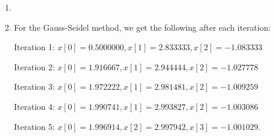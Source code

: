 \documentclass[12pt]{article}
\begin{document}
\begin{enumerate}[leftmargin=0em]
\begin{enumerate}[leftmargin=!]
        \item

        \begin{proof}
            Note that by part $(a)$, we have that for any vector $x\neq 0$,
            \[||A|| = \max_{y\neq 0}\frac{||Ay||}{||y||} \geq \frac{||Ax||}{||x||}.\]
            Multiplying by $||x||$ gives that $||Ax||\leq ||A||||x||$ for all $x\neq 0$. Furthermore, note that the inequality also holds when $x=0$, since $Ax=0$. Therefore,
            \[||Ax||\leq ||A||||x||\]
            for all $x$. We then have that
            \[||AB|| = \max_{||x||=1||}||ABx||  \leq \max_{||x||=1}||A||||Bx||=||A||\max_{||x||=1}||Bx||= ||A||||B||\]
            which is the desired result.
        \end{proof}
        
        \item 
        \begin{proof}
            By repetedly applying part $(b)$, we have that for all $k\in \NN$ 
            \[||A^k||= ||A\cdot A^{k-1}||\leq ||A||||A^{k-1}|| =||A||||A\cdot A^{k-2}|| \leq {||A||}^2||A^{k-2}|| \leq \ldots ||A||^{k}.\]
        \end{proof}
        
        \item 
        \begin{proof}
            Note that by part $(b)$, we have
            \[||A||||A^{-1}|| \geq ||AA^{-1}|| = ||I|| = \max_{||x||=1}||Ix|| = \max_{||x||=1}||x|| = 1\]
            which is the desired result.
        \end{proof}
    \end{enumerate}

    \item 

    \item 
    For the Gauss-Seidel method, we get the following after each iteration:

    Iteration 1: $x[0] = 0.5000000, x[1] = 2.833333, x[2] = -1.083333$

    Iteration 2: $x[0] = 1.916667, x[1] = 2.944444, x[2] = -1.027778$

    Iteration 3: $x[0] = 1.972222, x[1] = 2.981481, x[2] = -1.009259$

    Iteration 4: $x[0] = 1.990741, x[1] = 2.993827, x[2] = -1.003086$

    Iteration 5: $x[0] = 1.996914, x[2] = 2.997942, x[3] = -1.001029$.


\end{enumerate}
\end{document}
